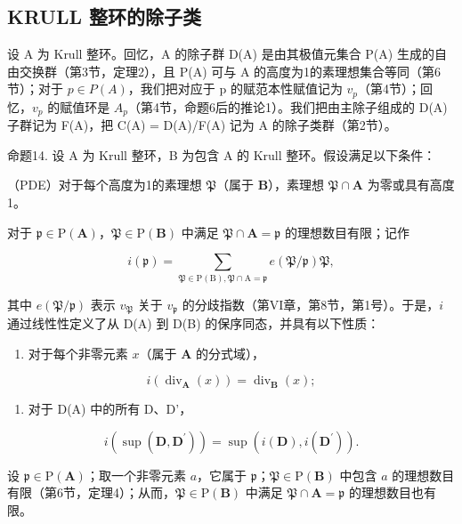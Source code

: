 \subsection{KRULL 整环的除子类}

设 A 为 Krull 整环。回忆，A 的除子群 D(A) 是由其极值元集合 P(A) 生成的自由交换群（第3节，定理2），且 P(A) 可与 A 的高度为1的素理想集合等同（第6节）；对于 \(p \in P(A)\)，我们把对应于 p 的赋范本性赋值记为 \(v_{p}\)（第4节）；回忆，\(v_{p}\) 的赋值环是 \(A_{p}\)（第4节，命题6后的推论1）。我们把由主除子组成的 D(A) 子群记为 F(A)，把 C(A) = D(A)/F(A) 记为 A 的除子类群（第2节）。

命题14. 设 A 为 Krull 整环，B 为包含 A 的 Krull 整环。假设满足以下条件：

（PDE）对于每个高度为1的素理想 \(\mathfrak{P}\)（属于 \(\mathbf{B}\)），素理想 \(\mathfrak{P} \cap \mathbf{A}\) 为零或具有高度1。

对于 \(\mathfrak{p} \in \mathrm{P}(\mathbf{A})\)，\(\mathfrak{P} \in \mathrm{P}(\mathbf{B})\) 中满足 \(\mathfrak{P} \cap \mathbf{A} = \mathfrak{p}\) 的理想数目有限；记作

\[
i (\mathfrak {p}) = \sum_ {\mathfrak {P} \in \mathrm{P} (\mathrm{B}), \mathfrak {P} \cap \mathrm{A} = \mathfrak {p}} e (\mathfrak {P} / \mathfrak {p}) \mathfrak {P},
\]

其中 \(e(\mathfrak{P} / \mathfrak{p})\) 表示 \(v_{\mathfrak{P}}\) 关于 \(v_{\mathfrak{p}}\) 的分歧指数（第VI章，第8节，第1号）。于是，\(i\) 通过线性性定义了从 D(A) 到 D(B) 的保序同态，并具有以下性质：

\begin{enumerate}
\def\labelenumi{(\alph{enumi})}
\tightlist
\item
  对于每个非零元素 \(x\)（属于 \(\mathbf{A}\) 的分式域），
\end{enumerate}

\[
i \left(\operatorname{div} _ {\mathbf {A}} (x)\right) = \operatorname{div} _ {\mathbf {B}} (x);
\]

\begin{enumerate}
\def\labelenumi{(\alph{enumi})}
\setcounter{enumi}{1}
\tightlist
\item
  对于 D(A) 中的所有 D、D'，
\end{enumerate}

\[
i \left(\sup (\mathbf {D}, \mathbf {D} ^ {\prime})\right) = \sup (i (\mathbf {D}), i (\mathbf {D} ^ {\prime})).
\]

设 \(\mathfrak{p} \in \mathrm{P}(\mathbf{A})\)；取一个非零元素 \(a\)，它属于 \(\mathfrak{p}\)；\(\mathfrak{P} \in \mathrm{P}(\mathbf{B})\) 中包含 \(a\) 的理想数目有限（第6节，定理4）；从而，\(\mathfrak{P} \in \mathrm{P}(\mathbf{B})\) 中满足 \(\mathfrak{P} \cap \mathbf{A} = \mathfrak{p}\) 的理想数目也有限。

